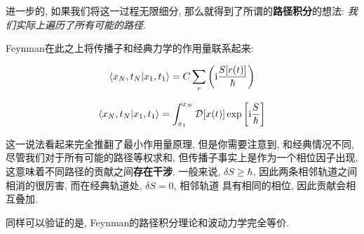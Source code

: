 进一步的, 如果我们将这一过程无限细分, 那么就得到了所谓的{\bf 路径积分}的想法:
\emph{我们实际上遍历了所有可能的路径}.

Feynman在此之上将传播子和经典力学的作用量联系起来:

\begin{equation}
  \begin{aligned}
    \bra{x_{N}, t _{N}}\ket{x_1, t_1} = C \sum_{r} \left({\rm i} \frac{S[r(t)]}{\hbar}\right)
  \end{aligned}
\end{equation}

\begin{equation}
  \begin{aligned}
    \bra{x_{N}, t _{N}}\ket{x_1, t_1} = \int _{x_1}^{x_N} \mathcal{D}[x(t)] \exp \left[{\rm i} \frac{S}{\hbar}\right]
  \end{aligned}
\end{equation}

\begin{remark}
  这一说法看起来完全推翻了最小作用量原理, 但是你需要注意到, 和经典情况不同,
  尽管我们对于所有可能的路径等权求和, 但传播子事实上是作为一个相位因子出现,
  这意味着不同路径的贡献之间{\bf 存在干涉}. 一般来说, $\delta S\geq \hbar$,
  因此两条相邻轨道之间相消的很厉害, 而在经典轨道处, $\delta S=0$, 相邻轨道
  具有相同的相位, 因此贡献会相互叠加.
\end{remark}

同样可以验证的是, Feynman的路径积分理论和波动力学完全等价.
